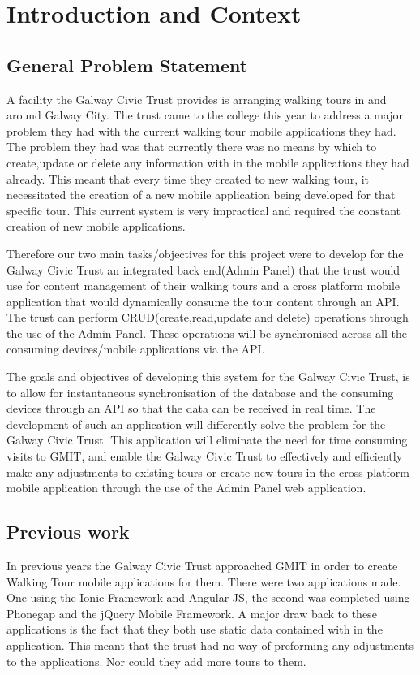 \chapter{Introduction and Context}
	\section {General Problem Statement}
	A facility the Galway Civic Trust provides is arranging walking tours in and around Galway City. The trust came to the college this year to address a major problem they had with the current walking tour mobile applications they had. The problem they had was that currently there was no means by which to create,update or delete any information with in the mobile applications they had already. This meant that every time they created to new walking tour, it necessitated the creation of a new mobile application being developed for that specific tour. This current system is very impractical and required the constant creation of new mobile applications.
		
	Therefore our two main tasks/objectives for this project were to develop for the Galway Civic Trust an integrated back end(Admin Panel) that the trust would use for content management of their walking tours and a cross platform mobile application that would dynamically consume the tour content through an API. The trust can perform CRUD(create,read,update and delete) operations through the use of the Admin Panel. These operations will be synchronised across all the consuming devices/mobile applications via the API.
	
	The goals and objectives of developing this system for the Galway Civic Trust, is to allow for instantaneous synchronisation of the database and the consuming devices through an API so that the data can be received in real time. The development of such an application will differently solve the problem for the Galway Civic Trust. This application will eliminate the need for time consuming visits to GMIT, and enable the Galway Civic Trust to effectively and efficiently make any adjustments to existing tours or create new tours in the cross platform mobile application through the use of the Admin Panel web application.
	
	\section {Previous work}
	In previous years the Galway Civic Trust approached GMIT in order to create Walking Tour mobile applications for them. There were two applications made. One using the Ionic Framework and  Angular JS, the second was completed using Phonegap and the jQuery Mobile Framework. A major draw back to these applications is the fact that they both use static data contained with in the application. This meant that the trust had no way of preforming any adjustments to the applications. Nor could they add more tours to them.
	
